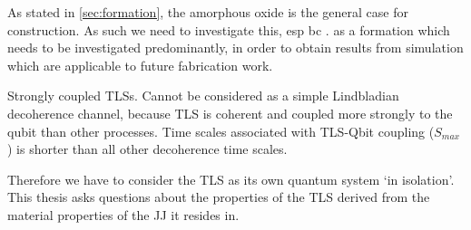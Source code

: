 
As stated in \cref{sec:formation}, the amorphous oxide is the general case for construction.
As such we need to investigate this, esp bc \cite{Oh2006}.
as a formation which needs to be investigated predominantly, in order to obtain results from simulation which are applicable to future fabrication work. 

Strongly coupled TLSs. Cannot be considered as a simple Lindbladian decoherence channel,
because TLS is coherent and coupled more strongly to the qubit than other processes.
Time scales associated with TLS-Qbit coupling ($S_{max}$) is shorter than all other decoherence time scales.

Therefore we have to consider the TLS as its own quantum system `in isolation'.
This thesis asks questions about the properties of the TLS derived from the material properties of the JJ it resides in. 

